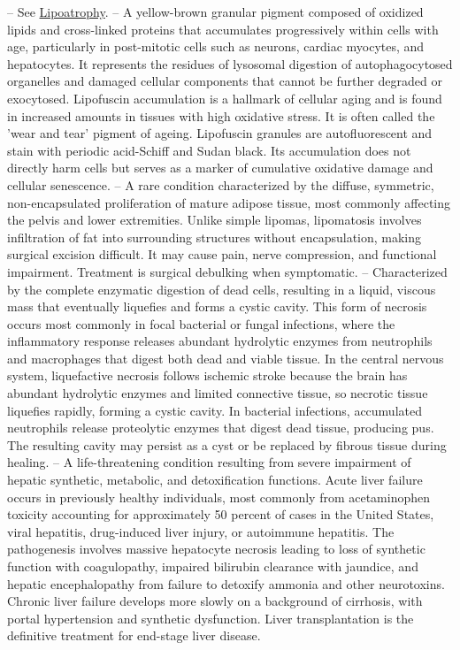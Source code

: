 -- See \hyperlink{Lipoatrophy}{Lipoatrophy}.
-- A yellow-brown granular pigment composed of oxidized lipids and cross-linked proteins that accumulates progressively within cells with age, particularly in post-mitotic cells such as neurons, cardiac myocytes, and hepatocytes. It represents the residues of lysosomal digestion of autophagocytosed organelles and damaged cellular components that cannot be further degraded or exocytosed. Lipofuscin accumulation is a hallmark of cellular aging and is found in increased amounts in tissues with high oxidative stress. It is often called the 'wear and tear' pigment of ageing. Lipofuscin granules are autofluorescent and stain with periodic acid-Schiff and Sudan black. Its accumulation does not directly harm cells but serves as a marker of cumulative oxidative damage and cellular senescence.
-- A rare condition characterized by the diffuse, symmetric, non-encapsulated proliferation of mature adipose tissue, most commonly affecting the pelvis and lower extremities. Unlike simple lipomas, lipomatosis involves infiltration of fat into surrounding structures without encapsulation, making surgical excision difficult. It may cause pain, nerve compression, and functional impairment. Treatment is surgical debulking when symptomatic.
-- Characterized by the complete enzymatic digestion of dead cells, resulting in a liquid, viscous mass that eventually liquefies and forms a cystic cavity. This form of necrosis occurs most commonly in focal bacterial or fungal infections, where the inflammatory response releases abundant hydrolytic enzymes from neutrophils and macrophages that digest both dead and viable tissue. In the central nervous system, liquefactive necrosis follows ischemic stroke because the brain has abundant hydrolytic enzymes and limited connective tissue, so necrotic tissue liquefies rapidly, forming a cystic cavity. In bacterial infections, accumulated neutrophils release proteolytic enzymes that digest dead tissue, producing pus. The resulting cavity may persist as a cyst or be replaced by fibrous tissue during healing.
-- A life-threatening condition resulting from severe impairment of hepatic synthetic, metabolic, and detoxification functions. Acute liver failure occurs in previously healthy individuals, most commonly from acetaminophen toxicity accounting for approximately 50 percent of cases in the United States, viral hepatitis, drug-induced liver injury, or autoimmune hepatitis. The pathogenesis involves massive hepatocyte necrosis leading to loss of synthetic function with coagulopathy, impaired bilirubin clearance with jaundice, and hepatic encephalopathy from failure to detoxify ammonia and other neurotoxins. Chronic liver failure develops more slowly on a background of cirrhosis, with portal hypertension and synthetic dysfunction. Liver transplantation is the definitive treatment for end-stage liver disease.
